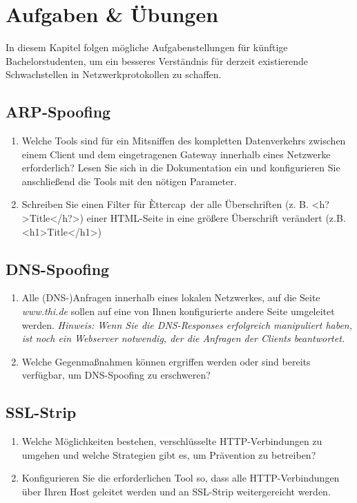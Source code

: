 \section{Aufgaben \& Übungen}

In diesem Kapitel folgen mögliche Aufgabenstellungen für künftige Bachelorstudenten, um ein besseres Verständnis für derzeit existierende Schwachstellen in Netzwerkprotokollen zu schaffen.

\subsection*{ARP-Spoofing}

\begin{enumerate}
\item Welche Tools sind für ein Mitsniffen des kompletten Datenverkehrs zwischen einem Client und dem eingetragenen Gateway innerhalb eines Netzwerke erforderlich? Lesen Sie sich in die Dokumentation ein und konfigurieren Sie anschließend die Tools mit den nötigen Parameter.
\item Schreiben Sie einen Filter für \`Ettercap\, der alle Überschriften (z. B. \textless h?\textgreater Title\textless /h?\textgreater) einer HTML-Seite in eine größere Überschrift verändert (z.B.  \textless h1\textgreater Title\textless /h1\textgreater)
\end{enumerate}

\subsection*{DNS-Spoofing}

\begin{enumerate}
\item Alle (DNS-)Anfragen innerhalb eines lokalen Netzwerkes, auf die Seite \textit{www.thi.de} sollen auf eine von Ihnen konfigurierte andere Seite umgeleitet werden. \textit{Hinweis: Wenn Sie die DNS-Responses erfolgreich manipuliert haben, ist noch ein Webserver notwendig, der die Anfragen der Clients beantwortet.}
\item Welche Gegenmaßnahmen können ergriffen werden oder sind bereits verfügbar, um DNS-Spoofing zu erschweren?
\end{enumerate}

\subsection*{SSL-Strip}

\begin{enumerate}
\item Welche Möglichkeiten bestehen, verschlüsselte HTTP-Verbindungen zu umgehen und welche Strategien gibt es, um Prävention zu betreiben?
\item Konfigurieren Sie die erforderlichen Tool so, dass alle HTTP-Verbindungen über Ihren Host geleitet werden und an SSL-Strip weitergereicht werden.
\end{enumerate}


